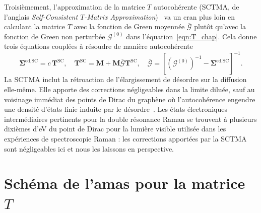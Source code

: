\bigskip
{}

Troisièmement, l'approximation de la matrice $T$ autocohérente (SCTMA, de l'anglais \textit{Self-Consistent $T$-Matrix Approximation})~\cite{klauderModificationElectronEnergy1961,peresElectronicPropertiesDisordered2006} va un cran plus loin en calculant la matrice $T$ avec la fonction de Green moyennée $\overline{\bm{\mathcal{G}}}$ plutôt qu'avec la fonction de Green non perturbée $\bm{\mathcal{G}}^{(0)}$ dans l'équation~\eqref{eqn:T_chap}. Cela donne trois équations couplées à résoudre de manière autocohérente
\begin{equation}
    \bm\Sigma^\text{ed,SC} = c\, \bm T^\text{SC},\quad \bm T^\text{SC} =\bm M+\bm M\overline{\bm{\mathcal{G}}}\bm T^\text{SC},\quad \overline{\bm{\mathcal{G}}} = \left[\left(\bm{\mathcal{G}}^{(0)}\right)^{-1}-\bm\Sigma^\text{ed,SC} \right]^{-1}.
\end{equation}
La SCTMA inclut la rétroaction de l'élargissement de désordre sur la diffusion elle-même. Elle apporte des corrections négligeables dans la limite diluée, sauf au voisinage immédiat des points de Dirac du graphène où l'autocohérence engendre une densité d'états finie induite par le désordre~\cite{peresElectronicPropertiesDisordered2006}. Les états électroniques intermédiaires pertinents pour la double résonance Raman se trouvent à plusieurs dixièmes d'eV du point de Dirac pour la lumière visible utilisée dans les expériences de spectroscopie Raman : les corrections apportées par la SCTMA sont négligeables ici et nous les laissons en perspective.

\section{Schéma de l'amas pour la matrice $T$}\label{sec:T_local}

